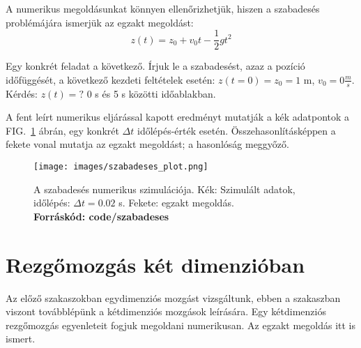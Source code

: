 \documentclass[%
 reprint,onecolumn,
 amsmath,amssymb,
 aps,
]{revtex4-2}
\begin{document}
    
A numerikus megoldásunkat könnyen ellenőrizhetjük, hiszen
a szabadesés problémájára ismerjük az egzakt
megoldást:
\begin{equation}
    z(t) = z_0 + v_0 t - \frac{1}{2} gt^2
\end{equation}





Egy konkrét feladat a következő. 
Írjuk le a szabadesést, azaz a pozíció időfüggését,
a következő kezdeti feltételek esetén:
$z(t=0) = z_0 = 1$ m, 
$v_0 = 0 \frac{m}{s}$.
Kérdés: $z(t) = ?$ 0 s és 5 s közötti időablakban.

A fent leírt numerikus eljárással kapott eredményt
mutatják a kék adatpontok a FIG.~\ref{fig:szabadeseseredmeny}
ábrán, egy konkrét $\Delta t$ időlépés-érték esetén.
Összehasonlításképpen a fekete vonal mutatja
az egzakt megoldást;
a hasonlóság meggyőző.


\begin{figure}[h]
    \centering
    \texttt{[image: images/szabadeses\_plot.png]}
    \caption{A szabadesés numerikus szimulációja. 
    Kék: Szimulált adatok, időlépés: $\Delta t = 0.02$ s.
    Fekete: egzakt megoldás. \\
    \bf{Forráskód: code/szabadeses}
    \label{fig:szabadeseseredmeny}}
\end{figure}






\section{Rezgőmozgás két dimenzióban}





Az előző szakaszokban egydimenziós mozgást vizsgáltunk, 
ebben a szakaszban viszont továbblépünk a 
kétdimenziós mozgások leírására.
Egy kétdimenziós rezgőmozgás egyenleteit fogjuk megoldani 
numerikusan. 
Az egzakt megoldás itt is ismert. 
\end{document}
